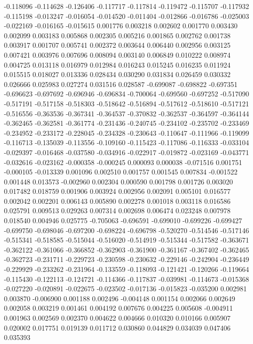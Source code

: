 -0.118096
-0.114628
-0.126406
-0.117717
-0.117814
-0.119472
-0.115707
-0.117932
-0.115198
-0.013247
-0.016054
-0.014520
-0.011404
-0.012866
-0.016786
-0.025003
-0.022169
-0.016165
-0.015615
0.001776
0.003218
0.002602
0.001770
0.003430
0.002099
0.003183
0.005868
0.002305
0.005216
0.001865
0.002762
0.001738
0.003917
0.001707
0.005741
0.002372
0.003644
0.006440
0.002956
0.003125
0.007421
0.003976
0.007696
0.008094
0.003140
0.006849
0.010222
0.008974
0.004725
0.013118
0.016979
0.012984
0.016243
0.015245
0.016235
0.011924
0.015515
0.018027
0.013336
0.028434
0.030290
0.031834
0.026459
0.030332
0.026666
0.025983
0.027274
0.031516
0.028587
-0.699087
-0.698822
-0.697351
-0.696623
-0.697692
-0.696946
-0.696834
-0.700064
-0.699560
-0.697252
-0.517090
-0.517191
-0.517158
-0.518303
-0.518642
-0.516894
-0.517612
-0.518610
-0.517121
-0.516556
-0.363536
-0.367341
-0.364537
-0.370832
-0.362537
-0.364597
-0.364144
-0.362465
-0.362581
-0.361774
-0.231436
-0.240745
-0.234102
-0.235702
-0.233469
-0.234952
-0.233172
-0.228045
-0.234328
-0.230643
-0.110647
-0.111966
-0.119099
-0.116713
-0.135039
-0.113556
-0.109160
-0.115423
-0.117086
-0.116333
-0.033104
-0.029397
-0.016468
-0.037580
-0.034916
-0.022917
-0.019872
-0.023169
-0.043771
-0.032616
-0.023162
-0.000358
-0.000245
0.000093
0.000038
-0.071516
0.001751
-0.000105
-0.013339
0.001096
0.002510
0.001757
0.001545
0.007834
-0.001522
0.001448
0.013573
-0.002960
0.002304
0.000590
0.001798
0.001726
0.003020
0.017482
0.018759
0.001906
0.003924
0.002956
0.002091
0.005101
0.016577
0.002042
0.002201
0.006143
0.005890
0.002278
0.001018
0.003118
0.016586
0.025791
0.009513
0.029263
0.007314
0.002698
0.006474
0.023248
0.007978
0.018540
0.004946
0.025775
-0.705063
-0.696591
-0.699010
-0.699226
-0.699427
-0.699750
-0.698046
-0.697200
-0.698224
-0.696798
-0.520270
-0.514546
-0.517146
-0.515341
-0.518585
-0.515044
-0.516020
-0.514919
-0.515344
-0.517582
-0.363671
-0.362122
-0.361066
-0.366852
-0.362903
-0.361900
-0.361167
-0.367402
-0.362465
-0.362723
-0.231711
-0.229723
-0.230598
-0.230632
-0.229146
-0.242904
-0.236449
-0.229929
-0.233262
-0.231964
-0.133559
-0.118093
-0.121421
-0.120266
-0.119664
-0.115430
-0.122113
-0.124721
-0.114366
-0.117837
-0.039981
-0.114673
-0.015368
-0.027220
-0.020891
-0.022675
-0.023502
-0.017136
-0.015823
-0.035200
0.002981
0.003870
-0.006900
0.001188
0.002496
-0.004148
0.001154
0.002066
0.002649
0.002058
0.003219
0.001461
0.004192
0.007676
0.004225
0.005608
-0.004911
0.001963
0.002569
0.002370
0.004622
0.004666
0.010320
0.010166
0.005907
0.020002
0.017751
0.019139
0.011712
0.030860
0.044829
0.034039
0.047406
0.035393
